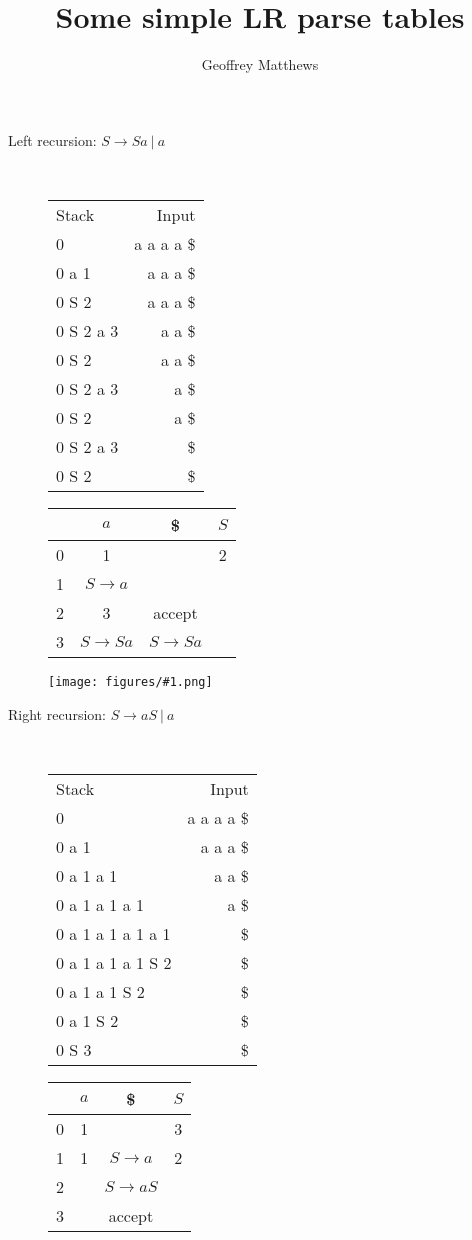 \documentclass[12pt]{article}
\title{Some simple LR parse tables}
\author{Geoffrey Matthews}
\newcommand{\myfig}[1]{\texttt{[image: figures/\#1.png]}}
\begin{document}
\maketitle

\begin{description}

\item[Left recursion: $ S \rightarrow Sa\ |\ a$]\mbox{}\\

\begin{tabular}{lr}
Stack & Input \\
0 & a a a a \$ \\
0 a 1 & a a a \$ \\
0 S 2 & a a a \$ \\
0 S 2 a 3 & a a  \$ \\
0 S 2 & a a  \$ \\
0 S 2 a 3 & a  \$ \\
0 S 2 & a  \$ \\
0 S 2 a 3 &  \$ \\
0 S 2 & \$ \\
\end{tabular}
\hfill
\begin{tabular}{|c|c|c|c|}\hline
 & $a$ & \$ & $S$ \\\hline
0 & 1 & & 2\\\hline
1 & $S\rightarrow a$ &&\\\hline
2 & 3 & accept& \\\hline
3 & $S \rightarrow Sa$ & $S \rightarrow Sa$ &\\\hline
\end{tabular}

\hfill
\myfig{lrparseexamples01}


\pagebreak



\item[Right recursion:
$ S \rightarrow aS\ |\ a$]\mbox{}\\

\begin{tabular}{lr}
Stack & Input \\
0 & a a a a \$ \\
0 a 1 & a a a  \$ \\
0 a 1 a 1 & a a  \$ \\
0 a 1 a 1 a 1 & a  \$ \\
0 a 1 a 1 a 1 a 1 & \$ \\
0 a 1 a 1 a 1 S 2 & \$ \\
0 a 1 a 1 S 2 & \$ \\
0 a 1 S 2 & \$ \\
0 S 3 & \$ \\
\end{tabular}
\hfill
\begin{tabular}{|c|c|c|c|}\hline
 & $a$ & \$ & $S$ \\\hline
0 & 1 & & 3 \\\hline
1 & 1 & $S \rightarrow a$ & 2 \\\hline
2 & & $S\rightarrow aS$ & \\\hline
3 &  & accept & \\\hline
\end{tabular}


\end{description}
\end{document}
